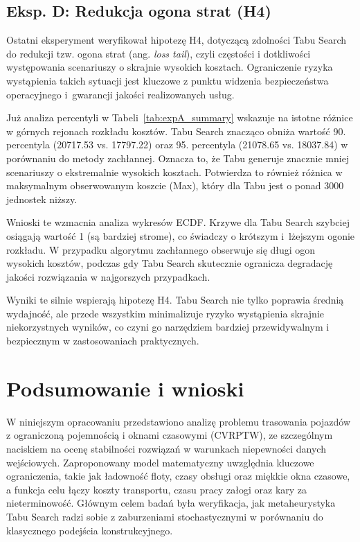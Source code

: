\subsection{Eksp. D: Redukcja ogona strat (H4)}

Ostatni eksperyment weryfikował hipotezę H4, dotyczącą zdolności Tabu Search do redukcji tzw. ogona strat (ang. \textit{loss tail}), czyli częstości i dotkliwości występowania scenariuszy o skrajnie wysokich kosztach. Ograniczenie ryzyka wystąpienia takich sytuacji jest kluczowe z punktu widzenia bezpieczeństwa operacyjnego i~gwarancji jakości realizowanych usług.

Już analiza percentyli w Tabeli~\ref{tab:expA_summary} wskazuje na istotne różnice w górnych rejonach rozkładu kosztów. Tabu Search znacząco obniża wartość 90. percentyla (20717.53 vs. 17797.22) oraz 95. percentyla (21078.65 vs. 18037.84) w porównaniu do metody zachłannej. Oznacza to, że Tabu generuje znacznie mniej scenariuszy o ekstremalnie wysokich kosztach. Potwierdza to również różnica w maksymalnym obserwowanym koszcie (Max), który dla Tabu jest o ponad 3000 jednostek niższy.

Wnioski te wzmacnia analiza wykresów ECDF. Krzywe dla Tabu Search szybciej osiągają wartość 1 (są bardziej strome), co świadczy o krótszym i~lżejszym ogonie rozkładu. W przypadku algorytmu zachłannego obserwuje się długi ogon wysokich kosztów, podczas gdy Tabu Search skutecznie ogranicza degradację jakości rozwiązania w najgorszych przypadkach.

Wyniki te silnie wspierają hipotezę H4. Tabu Search nie tylko poprawia średnią wydajność, ale przede wszystkim minimalizuje ryzyko wystąpienia skrajnie niekorzystnych wyników, co czyni go narzędziem bardziej przewidywalnym i bezpiecznym w zastosowaniach praktycznych.

\section{Podsumowanie i wnioski}

W niniejszym opracowaniu przedstawiono analizę problemu trasowania pojazdów z ograniczoną pojemnością i oknami czasowymi (CVRPTW), ze szczególnym naciskiem na ocenę stabilności rozwiązań w warunkach niepewności danych wejściowych. Zaproponowany model matematyczny uwzględnia kluczowe ograniczenia, takie jak ładowność floty, czasy obsługi oraz miękkie okna czasowe, a funkcja celu łączy koszty transportu, czasu pracy załogi oraz kary za nieterminowość. Głównym celem badań była weryfikacja, jak metaheurystyka Tabu Search radzi sobie z zaburzeniami stochastycznymi w porównaniu do klasycznego podejścia konstrukcyjnego.

